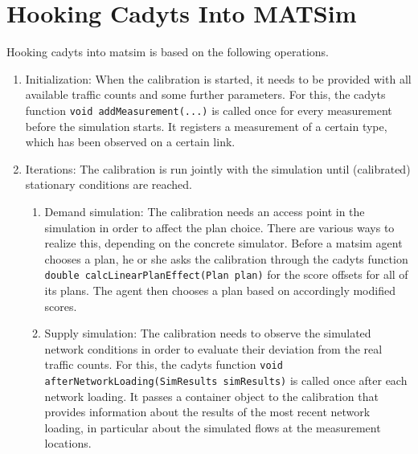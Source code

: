\section{Hooking Cadyts Into MATSim}
Hooking \gls{cadyts} into \gls{matsim} is based on the following operations.
\begin{enumerate}\styleEnumerate
\item Initialization: When the calibration is started, it needs to be provided with all available 
traffic counts and some further parameters. 
For this, the \gls{cadyts} function \lstinline|void addMeasurement(...)| is called once for every 
measurement before the simulation starts. It registers a measurement of a certain type, which 
has been observed on a certain link.
\item Iterations: The calibration is run jointly with the simulation until (calibrated) 
stationary conditions are reached.
	\begin{enumerate}[label=\emph{\alph*})]
	\item Demand simulation: The calibration needs an access point in the simulation in order 
	to affect the plan choice. There are various ways to realize this, depending on the concrete 
	simulator.	
	Before a \gls{matsim} agent chooses a plan, he or she asks the calibration through the 
	\gls{cadyts} function
	\lstinline|double calcLinearPlanEffect(Plan plan)| for the score offsets for
	all of its plans.
	The agent then chooses a plan based on accordingly modified scores.
	\item Supply simulation: The calibration needs to observe the simulated network conditions 
	in order to evaluate their deviation from the real traffic counts.
	For this, the \gls{cadyts} function \lstinline|void afterNetworkLoading(SimResults simResults)| 
	is called once after each network loading. It passes a container object to the calibration that 
	provides information about the results of the most recent network loading, in particular about 
	the simulated flows at the measurement locations.
	\end{enumerate}
\end{enumerate}

